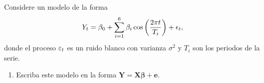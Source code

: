 \documentclass[../main.tex]{subfiles}
\begin{document}
    \begin{enunciado}
        Considere un modelo de la forma
            \begin{align}
            	\label{1:modelo}
            	Y_t = \beta_0 + \sum_{i = 1}^{6} \beta_i \cos\left( \frac{2\pi t}{T_i} \right) + \epsilon_t,
            \end{align}
        donde el proceso $\varepsilon_t$ es un ruido blanco con varianza $\sigma^2$ y $T_i$ son los periodos de la serie.
            \begin{enumerate}
            	\item Escriba este modelo en la forma $\boldsymbol{Y} = \boldsymbol{X} \boldsymbol{\beta} + \boldsymbol{e}$.
            \end{enumerate}
    \end{enunciado}
    
\end{document}
